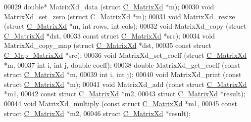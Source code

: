 \begin{DoxyCode}
00029   \textcolor{keywordtype}{double}* MatrixXd\_data       (\textcolor{keyword}{struct} \hyperlink{struct_c___matrix_xd}{C\_MatrixXd} *m);
00030   \textcolor{keywordtype}{void}    MatrixXd\_set\_zero   (\textcolor{keyword}{struct} \hyperlink{struct_c___matrix_xd}{C\_MatrixXd} *m);
00031   \textcolor{keywordtype}{void}    MatrixXd\_resize     (\textcolor{keyword}{struct} \hyperlink{struct_c___matrix_xd}{C\_MatrixXd} *m, \textcolor{keywordtype}{int} rows, \textcolor{keywordtype}{int} cols);
00032   \textcolor{keywordtype}{void}    MatrixXd\_copy       (\textcolor{keyword}{struct} \hyperlink{struct_c___matrix_xd}{C\_MatrixXd} *dst,
00033                                \textcolor{keyword}{const} \textcolor{keyword}{struct} \hyperlink{struct_c___matrix_xd}{C\_MatrixXd} *src);
00034   \textcolor{keywordtype}{void}    MatrixXd\_copy\_map   (\textcolor{keyword}{struct} \hyperlink{struct_c___matrix_xd}{C\_MatrixXd} *dst,
00035                                \textcolor{keyword}{const} \textcolor{keyword}{struct} \hyperlink{struct_c___map___matrix_xd}{C\_Map\_MatrixXd} *src);  
00036   \textcolor{keywordtype}{void}    MatrixXd\_set\_coeff  (\textcolor{keyword}{struct} \hyperlink{struct_c___matrix_xd}{C\_MatrixXd} *m,
00037                                \textcolor{keywordtype}{int} i, \textcolor{keywordtype}{int} j, \textcolor{keywordtype}{double} coeff);
00038   \textcolor{keywordtype}{double}  MatrixXd\_get\_coeff  (\textcolor{keyword}{const} \textcolor{keyword}{struct} \hyperlink{struct_c___matrix_xd}{C\_MatrixXd} *m,
00039                                \textcolor{keywordtype}{int} i, \textcolor{keywordtype}{int} j);
00040   \textcolor{keywordtype}{void}    MatrixXd\_print      (\textcolor{keyword}{const} \textcolor{keyword}{struct} \hyperlink{struct_c___matrix_xd}{C\_MatrixXd} *m);
00041   \textcolor{keywordtype}{void}    MatrixXd\_add        (\textcolor{keyword}{const} \textcolor{keyword}{struct} \hyperlink{struct_c___matrix_xd}{C\_MatrixXd} *m1,
00042                                \textcolor{keyword}{const} \textcolor{keyword}{struct} \hyperlink{struct_c___matrix_xd}{C\_MatrixXd} *m2,
00043                                \textcolor{keyword}{struct} \hyperlink{struct_c___matrix_xd}{C\_MatrixXd} *result);  
00044   \textcolor{keywordtype}{void}    MatrixXd\_multiply   (\textcolor{keyword}{const} \textcolor{keyword}{struct} \hyperlink{struct_c___matrix_xd}{C\_MatrixXd} *m1,
00045                                \textcolor{keyword}{const} \textcolor{keyword}{struct} \hyperlink{struct_c___matrix_xd}{C\_MatrixXd} *m2,
00046                                \textcolor{keyword}{struct} \hyperlink{struct_c___matrix_xd}{C\_MatrixXd} *result);

\end{DoxyCode}
